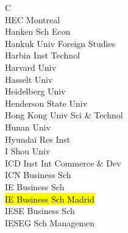 \documentclass[a4paper]{article}
\begin{document}
\begin{multicols*}{2}
\begin{footnotesize}
C \\ HEC Montreal \\ Hanken Sch Econ \\ Hankuk Univ Foreign Studies \\ Harbin Inst Technol \\ Harvard Univ \\ Hasselt Univ \\ Heidelberg Univ \\ Henderson State Univ \\ Hong Kong Univ Sci \& Technol \\ Hunan Univ \\ Hyundai Res Inst \\ I Shou Univ \\ ICD Inst Int Commerce \& Dev \\ ICN Business Sch \\ IE Business Sch \\ \hl{IE Business Sch Madrid} \\ IESE Business Sch \\ IESEG Sch Managemen
\end{footnotesize}
\end{multicols*}
\end{document}
